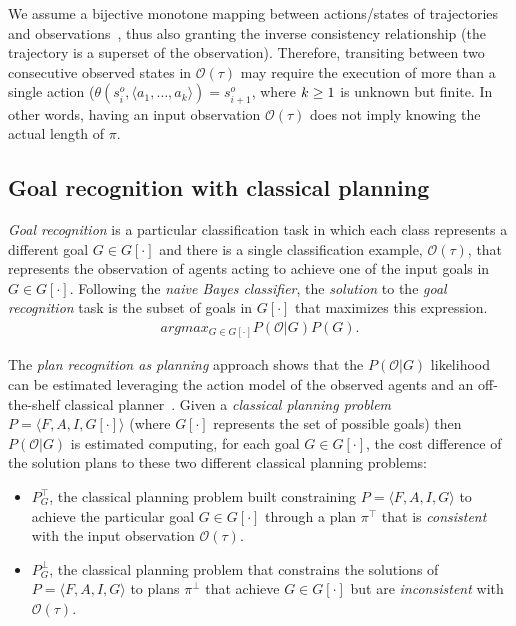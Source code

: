 \documentclass{article}
\newcommand{\tup}[1]{{\langle #1 \rangle}}
\begin{document}
We assume a bijective monotone mapping between actions/states of trajectories and observations~\cite{ramirez2009plan}, thus also granting the inverse consistency relationship (the trajectory is a superset of the observation). Therefore, transiting between two consecutive observed states in $\mathcal{O}(\tau)$ may require the execution of more than a single action ($\theta(s_i^o,\tup{a_1,\ldots,a_k})=s_{i+1}^o$, where ${\small k\geq 1}$ is unknown but finite. In other words, having an input observation $\mathcal{O}(\tau)$ does not imply knowing the actual length of $\pi$.

\subsection{Goal recognition with classical planning}
{\em Goal recognition} is a particular classification task in which each class represents a different goal $G\in G[\cdot]$ and there is a single classification example, $\mathcal{O}(\tau)$, that represents the observation of agents acting to achieve one of the input goals in $G\in G[\cdot]$. Following the {\em naive Bayes classifier}, the {\em solution} to the {\em goal recognition} task is the subset of goals in $G[\cdot]$ that maximizes this expression.
\begin{align}
argmax_{G\in G[\cdot]} P(\mathcal{O}|G) P(G).
\end{align}

The {\em plan recognition as planning} approach shows that the $P(\mathcal{O}|G)$ likelihood can be estimated leveraging the action model of the observed agents and an off-the-shelf classical planner~\cite{ramirez2012plan}. Given a {\em classical planning problem} $P=\tup{F,A,I,G[\cdot]}$ (where $G[\cdot]$ represents the set of possible goals) then $P(\mathcal{O}|G)$ is estimated computing, for each goal $G\in G[\cdot]$, the cost difference of the solution plans to these two different classical planning problems:
\begin{itemize}
\item $P^{\top}_G$, the classical planning problem built constraining $P=\tup{F,A,I,G}$ to achieve the particular goal $G\in G[\cdot]$ through a plan $\pi^\top$ that is {\em consistent} with the input observation $\mathcal{O}(\tau)$.
\item $P^{\bot}_G$, the classical planning problem that constrains the solutions of $P=\tup{F,A,I,G}$ to plans $\pi^\bot$ that achieve $G\in G[\cdot]$ but are {\em inconsistent} with $\mathcal{O}(\tau)$.
\end{itemize}
\end{document}
